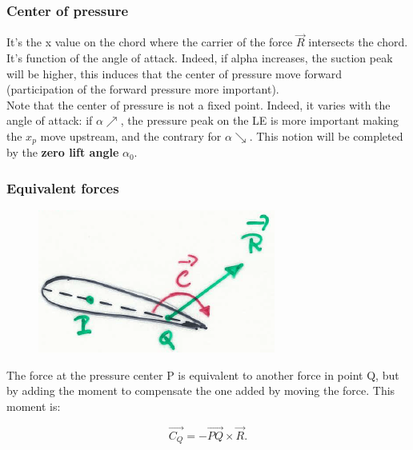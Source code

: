 				\subsubsection{Center of pressure}
					It's the x value on the chord where the carrier of the force $\vec{R}$ intersects the chord. It's function of the angle of attack. Indeed, if alpha increases, the suction peak will be higher, this induces that the center of pressure move forward (participation of the forward pressure more important).\\
					
					Note that the center of pressure is not a fixed point. Indeed, it varies with the angle of attack: if $\alpha \nearrow$, the pressure peak on the LE is more important making the $x_p$ move upstream, and the contrary for $\alpha \searrow$. This notion will be completed by the \textbf{zero lift angle} $\alpha _{0}$.
					
				\subsubsection{Equivalent forces}
					\begin{figure}
					\vspace{-5mm}
					\includegraphics[scale=0.3]{ch2/11}
					\end{figure}
					The force at the pressure center P is equivalent to another force in point Q, but by adding the moment to compensate the one added by moving the force. This moment is:
					
					\begin{equation}
					\vec{C_Q} = -\vec{PQ}\times \vec{R}.
					\end{equation}
					
